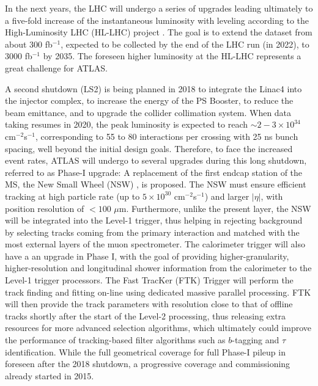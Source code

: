 In the next years, the LHC will undergo a  series  of  upgrades  leading  ultimately  to  a five-fold  increase  of  the  instantaneous  luminosity  with  leveling according to the High-Luminosity LHC (HL-LHC) project \cite{BejarAlonso:2069130}.  The goal is to extend the dataset from about 300 fb$^{-1}$, expected to be collected by the end of the LHC run (in 2022), to 3000 fb$^{-1}$ by 2035. The foreseen higher  luminosity  at  the  HL-LHC  represents  a  great  challenge  for  ATLAS.\par
A  second  shutdown  (LS2)  is  being  planned  in  2018  to  integrate  the  Linac4  into  the  injector  complex,  to increase the energy of the PS Booster, to reduce the beam emittance, and to upgrade the collider collimation system.  When data taking resumes in 2020, the peak luminosity is expected to reach $\sim 2-3 \times 10^{34}$ cm$^{-2}$s$^{-1}$, corresponding  to  55  to  80  interactions  per  crossing  with  25  ns  bunch  spacing,  well  beyond  the initial  design  goals.
Therefore, to  face the increased event rates, ATLAS will undergo to several upgrades during this long shutdown, referred to as Phase-I upgrade:
\bi
\ib A  replacement  of  the   first  endcap  station  of the  MS,  the  New  Small  Wheel  (NSW) \cite{NSW},  is  proposed.   The  NSW  must  ensure  efficient tracking at high particle rate (up to $5 \times 10^{30}$ cm$^{-2}$s$^{-1}$) and larger $|\eta|$, with position resolution of $<100$ $\mu$m. Furthermore, unlike the present layer, the NSW will be integrated into the Level-1 trigger, thus helping in rejecting background by selecting tracks coming from the primary interaction and matched with the most external layers of the muon spectrometer.
\ib The calorimeter trigger \cite{CALORUP} will also have a an upgrade in Phase I, with the goal of providing higher-granularity,  higher-resolution and longitudinal shower information from the calorimeter to the Level-1 trigger processors.
\ib The Fast TracKer (FTK) \cite{FTK} Trigger will perform the track  finding and  fitting on-line using dedicated massive parallel processing.  FTK will then provide the track parameters with resolution close to that of offline tracks shortly after the start of the Level-2 processing, thus releasing extra resources for more advanced selection algorithms, which ultimately could improve the performance of tracking-based  filter algorithms such as $b$-tagging and $\tau$ identification. While the full geometrical coverage for full Phase-I pileup in foreseen after the 2018 shutdown, a progressive coverage and commissioning already started in 2015.\\
